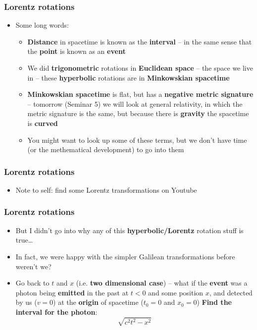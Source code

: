 \documentclass{beamer}
\begin{document}
\begin{frame}
  \frametitle{Lorentz rotations}
  \begin{itemize}
    \item<1-> Some long words:
      \begin{itemize}
	\item<2-> \textbf{Distance} in spacetime is known as the \textbf{interval} -- in the same sense that the \textbf{point} is known as an \textbf{event}
	\item<3-> We did \textbf{trigonometric} rotations in \textbf{Euclidean space} -- the space we live in -- these \textbf{hyperbolic} rotations are in \textbf{Minkowskian spacetime}
	\item<4-> \textbf{Minkowskian spacetime} is flat, but has a \textbf{negative metric signature} -- tomorrow (Seminar 5) we will look at general relativity, in which the metric signature is the same, but because there is \textbf{gravity} the spacetime is \textbf{curved}
	\item<5-> You might want to look up some of these terms, but we don't have time (or the methematical development) to go into them
      \end{itemize}
  \end{itemize}
\end{frame}

\begin{frame}
  \frametitle{Lorentz rotations}
  \begin{itemize}
    \item<1-> Note to self: find some Lorentz transformations on Youtube
  \end{itemize}
\end{frame}

\begin{frame}
  \frametitle{Lorentz rotations}
  \begin{itemize}
    \item<1-> But I didn't go into why any of this \textbf{hyperbolic/Lorentz} rotation stuff is true\ldots
    \item<2-> In fact, we were happy with the simpler Galilean transformations before weren't we?
    \item<3-> Go back to $t$ and $x$ (i.e. \textbf{two dimensional case}) -- what if the \textbf{event} was a photon being \textbf{emitted} in the past at $t<0$ and some position $x$, and detected by us ($v=0$) at the \textbf{origin} of spacetime ($t_0=0$ and $x_0=0$) \textbf{Find the interval for the photon}:
      \begin{equation*}
	\sqrt{c^2t^2-x^2}
      \end{equation*}
  \end{itemize}
\end{frame}
\end{document}
